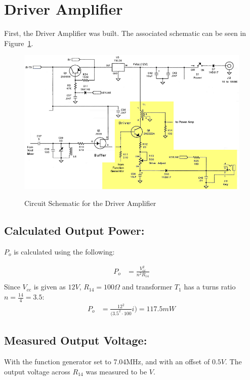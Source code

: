 \section{Driver Amplifier}

First, the Driver Amplifier was built. The associated schematic can be
seen in Figure~\ref{DriverAmp}.

\begin{figure}[h!]
  \centering
  \includegraphics[scale=0.6]{./img/DriverAmp.png}
  \label{DriverAmp}
  \caption{Circuit Schematic for the Driver Amplifier}
\end{figure}

\subsection{Calculated Output Power: }
  $P_o$ is calculated using the following:

  \begin{align*}
    P_o &= \frac{V_{cc}^2}{n^2 R_{14}}\\
  \end{align*}
  Since $V_{cc}$ is given as $12V$, $R_{14} = 100 \Omega$ and transformer $T_1$ has a turns ratio $n =
  \frac{14}{4} = 3.5$:
  \begin{align*}
    P_o &= \frac{12^2}{(3.5^2 \cdot 100}i) = \boxed{117.5 mW}
  \end{align*}
\subsection{Measured Output Voltage: }
With the function generator set to 7.04MHz, and with an offset of 
$0.5V$. The output voltage across $R_{14}$ was measured to be $\boxed{ V}$.

